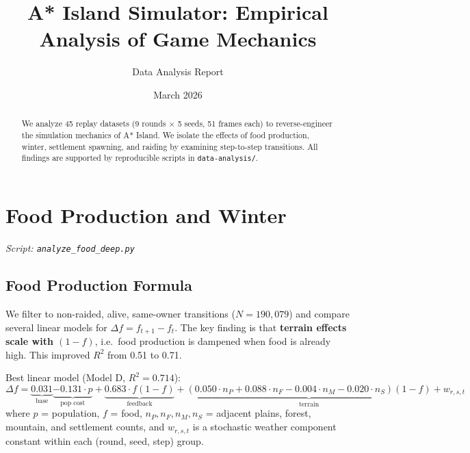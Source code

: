 \documentclass[11pt,a4paper]{article}
\title{A* Island Simulator: Empirical Analysis of Game Mechanics}
\author{Data Analysis Report}
\date{March 2026}
\begin{document}
\maketitle

\begin{abstract}
We analyze 45 replay datasets (9 rounds $\times$ 5 seeds, 51 frames each) to reverse-engineer the simulation mechanics of A* Island. We isolate the effects of food production, winter, settlement spawning, and raiding by examining step-to-step transitions. All findings are supported by reproducible scripts in \texttt{data-analysis/}.
\end{abstract}

\section{Food Production and Winter}
\label{sec:food}
\textit{Script: \texttt{analyze\_food\_deep.py}}

\subsection{Food Production Formula}
We filter to non-raided, alive, same-owner transitions ($N = 190{,}079$) and compare several linear models for $\Delta f = f_{t+1} - f_t$. The key finding is that \textbf{terrain effects scale with $(1-f)$}, i.e.\ food production is dampened when food is already high. This improved $R^2$ from 0.51 to 0.71.

Best linear model (Model D, $R^2 = 0.714$):
\begin{equation}
\Delta f = \underbrace{0.031}_{\text{base}} \underbrace{- 0.131 \cdot p}_{\text{pop cost}} + \underbrace{0.683 \cdot f(1{-}f)}_{\text{feedback}} + \underbrace{(0.050 \cdot n_P + 0.088 \cdot n_F - 0.004 \cdot n_M - 0.020 \cdot n_S)(1{-}f)}_{\text{terrain}} + w_{r,s,t}
\end{equation}
where $p$ = population, $f$ = food, $n_P, n_F, n_M, n_S$ = adjacent plains, forest, mountain, and settlement counts, and $w_{r,s,t}$ is a stochastic weather component constant within each (round, seed, step) group.
\end{document}
